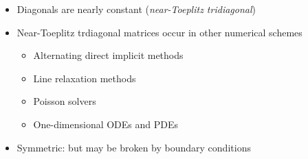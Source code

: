 \begin{frame}
\begin{columns}
\begin{column}{0.5\textwidth}
\begin{itemize}
\item Diagonals are nearly constant (\emph{near-Toeplitz tridiagonal})
\item Near-Toeplitz trdiagonal matrices occur in other numerical schemes
\begin{itemize}
    \item Alternating direct implicit methods
    \item Line relaxation methods
    \item Poisson solvers
    \item One-dimensional ODEs and PDEs
\end{itemize}
\item Symmetric: but may be broken by boundary conditions
\end{itemize}
\end{column}
\begin{column}{0.5\textwidth}
\centering
{}
\end{column}
\end{columns}
\end{frame}

